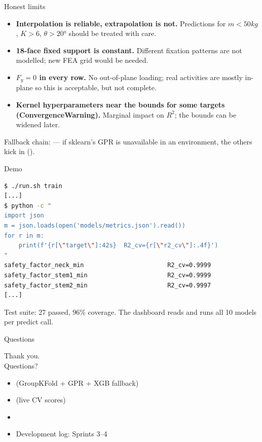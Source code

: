\begin{frame}{Honest limits}
  \begin{itemize}
    \item \textbf{Interpolation is reliable, extrapolation is not.}
          Predictions for \(m < 50\unit{kg}\), \(K > 6\), \(\theta > 20°\)
          should be treated with care.
    \item \textbf{18-face fixed support is constant.} Different fixation
          patterns are not modelled; new FEA grid would be needed.
    \item \textbf{\(F_y = 0\) in every row.} No out-of-plane loading;
          real activities are mostly in-plane so this is acceptable,
          but not complete.
    \item \textbf{Kernel hyperparameters near the bounds for some targets
          (ConvergenceWarning).} Marginal impact on \(R^2\); the bounds
          can be widened later.
  \end{itemize}
  \vspace{0.4cm}
  \footnotesize
  Fallback chain:  --- if
  sklearn's GPR is unavailable in an environment, the others kick in
  ().
\end{frame}

\begin{frame}[fragile]{Demo}
\begin{lstlisting}[language=bash, basicstyle=\ttfamily\small]
$ ./run.sh train
[...]
$ python -c "
import json
m = json.loads(open('models/metrics.json').read())
for r in m:
    print(f'{r[\"target\"]:42s}  R2_cv={r[\"r2_cv\"]:.4f}')
"
safety_factor_neck_min                       R2_cv=0.9999
safety_factor_stem1_min                      R2_cv=0.9999
safety_factor_stem2_min                      R2_cv=0.9997
[...]
\end{lstlisting}
  \vspace{0.4cm}
  Test suite: \alert{27 passed}, 96\% coverage. The dashboard reads
   and runs all 10 models per predict call.
\end{frame}

\begin{frame}{Questions}
  \vfill
  \begin{center}
    \Large Thank you.\\[0.4cm]
    \normalsize Questions?
  \end{center}
  \vfill
  \scriptsize
  \begin{itemize}
    \item {} (GroupKFold + GPR + XGB fallback)
    \item {} (live CV scores)
    \item {}
    \item Development log:  Sprints 3--4
  \end{itemize}
\end{frame}


